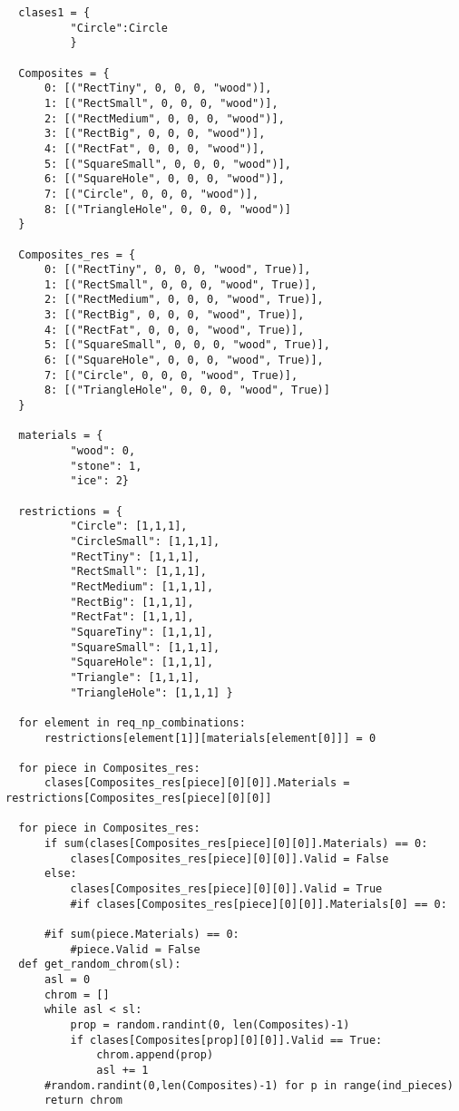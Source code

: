 \begin{verbatim}
  clases1 = {
          "Circle":Circle
          }

  Composites = {
      0: [("RectTiny", 0, 0, 0, "wood")],
      1: [("RectSmall", 0, 0, 0, "wood")],
      2: [("RectMedium", 0, 0, 0, "wood")],
      3: [("RectBig", 0, 0, 0, "wood")],
      4: [("RectFat", 0, 0, 0, "wood")],
      5: [("SquareSmall", 0, 0, 0, "wood")],
      6: [("SquareHole", 0, 0, 0, "wood")],
      7: [("Circle", 0, 0, 0, "wood")],
      8: [("TriangleHole", 0, 0, 0, "wood")]
  }

  Composites_res = {
      0: [("RectTiny", 0, 0, 0, "wood", True)],
      1: [("RectSmall", 0, 0, 0, "wood", True)],
      2: [("RectMedium", 0, 0, 0, "wood", True)],
      3: [("RectBig", 0, 0, 0, "wood", True)],
      4: [("RectFat", 0, 0, 0, "wood", True)],
      5: [("SquareSmall", 0, 0, 0, "wood", True)],
      6: [("SquareHole", 0, 0, 0, "wood", True)],
      7: [("Circle", 0, 0, 0, "wood", True)],
      8: [("TriangleHole", 0, 0, 0, "wood", True)]
  }

  materials = {
          "wood": 0,
          "stone": 1,
          "ice": 2}

  restrictions = {
          "Circle": [1,1,1],
          "CircleSmall": [1,1,1],
          "RectTiny": [1,1,1],
          "RectSmall": [1,1,1],
          "RectMedium": [1,1,1],
          "RectBig": [1,1,1],
          "RectFat": [1,1,1],
          "SquareTiny": [1,1,1],
          "SquareSmall": [1,1,1],
          "SquareHole": [1,1,1],
          "Triangle": [1,1,1],
          "TriangleHole": [1,1,1] }

  for element in req_np_combinations:
      restrictions[element[1]][materials[element[0]]] = 0
      
  for piece in Composites_res:
      clases[Composites_res[piece][0][0]].Materials = restrictions[Composites_res[piece][0][0]]
      
  for piece in Composites_res:
      if sum(clases[Composites_res[piece][0][0]].Materials) == 0:
          clases[Composites_res[piece][0][0]].Valid = False
      else:
          clases[Composites_res[piece][0][0]].Valid = True
          #if clases[Composites_res[piece][0][0]].Materials[0] == 0:
              
      #if sum(piece.Materials) == 0:
          #piece.Valid = False
  def get_random_chrom(sl):
      asl = 0
      chrom = []
      while asl < sl:
          prop = random.randint(0, len(Composites)-1)
          if clases[Composites[prop][0][0]].Valid == True:
              chrom.append(prop)
              asl += 1
      #random.randint(0,len(Composites)-1) for p in range(ind_pieces)
      return chrom


\end{verbatim}
